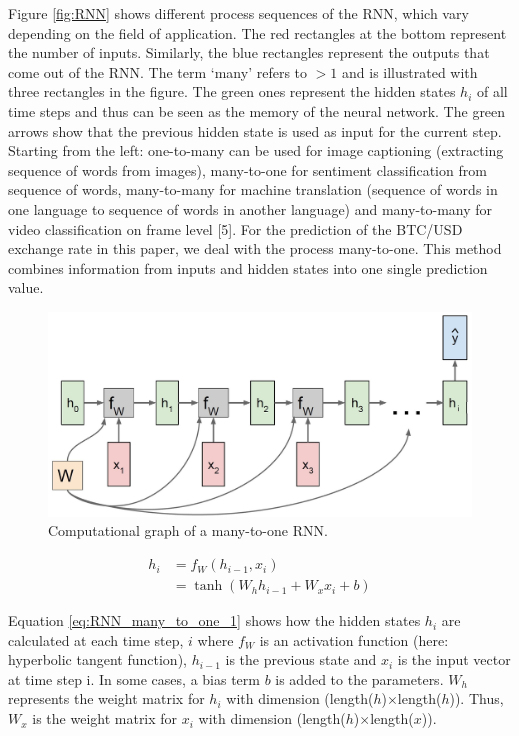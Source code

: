 \documentclass[
]{article}
\begin{document}
Figure \ref{fig:RNN} shows different process sequences of the RNN, which
vary depending on the field of application. The red rectangles at the
bottom represent the number of inputs. Similarly, the blue rectangles
represent the outputs that come out of the RNN. The term `many' refers
to \(>1\) and is illustrated with three rectangles in the figure. The
green ones represent the hidden states \(h_i\) of all time steps and
thus can be seen as the memory of the neural network. The green arrows
show that the previous hidden state is used as input for the current
step. Starting from the left: one-to-many can be used for image
captioning (extracting sequence of words from images), many-to-one for
sentiment classification from sequence of words, many-to-many for
machine translation (sequence of words in one language to sequence of
words in another language) and many-to-many for video classification on
frame level {[}5{]}. For the prediction of the BTC/USD exchange rate in
this paper, we deal with the process many-to-one. This method combines
information from inputs and hidden states into one single prediction
value.

\begin{figure}

{\centering \includegraphics[width=0.7\linewidth]{images/RNN_many_to_one} 

}

\caption{Computational graph of a many-to-one RNN.}\label{fig:RNN_many_to_one}
\end{figure}

\begin{align} \label{eq:RNN_many_to_one_1}
  h_{i} & = f_{W}(h_{i-1}, x_{i}) \\
  & = \tanh(W_{h}h_{i-1} + W_{x}x_{i} + b) \nonumber 
\end{align}

Equation \ref{eq:RNN_many_to_one_1} shows how the hidden states
\(h_{i}\) are calculated at each time step, \(i\) where \(f_{W}\) is an
activation function (here: hyperbolic tangent function), \(h_{i-1}\) is
the previous state and \(x_i\) is the input vector at time step i. In
some cases, a bias term \(b\) is added to the parameters. \(W_{h}\)
represents the weight matrix for \(h_{i}\) with dimension
(length(\(h\))\(\times\)length(\(h\))). Thus, \(W_{x}\) is the weight
matrix for \(x_{i}\) with dimension
(length(\(h\))\(\times\)length(\(x\))).
\end{document}
